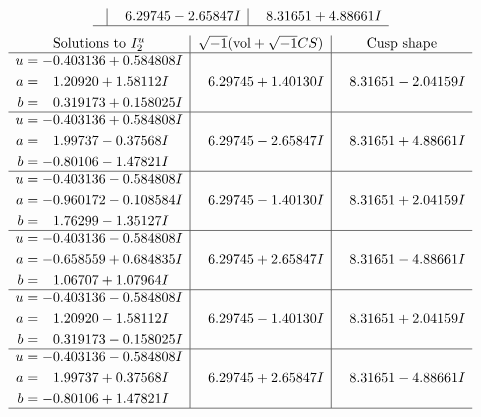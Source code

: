 \documentclass[1p]{elsarticle_modified}
\theoremstyle{definition}
\newcommand{\I}{\sqrt{-1}}
\begin{document}
$$\begin{array}{c|c|c}
 & \phantom{-}6.29745 - 2.65847 I & \phantom{-}8.31651 + 4.88661 I\\
 \hline 
 \end{array}$$\newpage$$\begin{array}{c|c|c}  
\text{Solutions to }I^u_{2}& \I (\text{vol} + \sqrt{-1}CS) & \text{Cusp shape}\\
 \hline 
\begin{aligned}
u &= -0.403136 + 0.584808 I \\
a &= \phantom{-}1.20920 + 1.58112 I \\
b &= \phantom{-}0.319173 + 0.158025 I\end{aligned}
 & \phantom{-}6.29745 + 1.40130 I & \phantom{-}8.31651 - 2.04159 I \\ \hline\begin{aligned}
u &= -0.403136 + 0.584808 I \\
a &= \phantom{-}1.99737 - 0.37568 I \\
b &= -0.80106 - 1.47821 I\end{aligned}
 & \phantom{-}6.29745 - 2.65847 I & \phantom{-}8.31651 + 4.88661 I \\ \hline\begin{aligned}
u &= -0.403136 - 0.584808 I \\
a &= -0.960172 - 0.108584 I \\
b &= \phantom{-}1.76299 - 1.35127 I\end{aligned}
 & \phantom{-}6.29745 - 1.40130 I & \phantom{-}8.31651 + 2.04159 I \\ \hline\begin{aligned}
u &= -0.403136 - 0.584808 I \\
a &= -0.658559 + 0.684835 I \\
b &= \phantom{-}1.06707 + 1.07964 I\end{aligned}
 & \phantom{-}6.29745 + 2.65847 I & \phantom{-}8.31651 - 4.88661 I \\ \hline\begin{aligned}
u &= -0.403136 - 0.584808 I \\
a &= \phantom{-}1.20920 - 1.58112 I \\
b &= \phantom{-}0.319173 - 0.158025 I\end{aligned}
 & \phantom{-}6.29745 - 1.40130 I & \phantom{-}8.31651 + 2.04159 I \\ \hline\begin{aligned}
u &= -0.403136 - 0.584808 I \\
a &= \phantom{-}1.99737 + 0.37568 I \\
b &= -0.80106 + 1.47821 I\end{aligned}
 & \phantom{-}6.29745 + 2.65847 I & \phantom{-}8.31651 - 4.88661 I\\
 \hline 
 \end{array}$$\newpage\newpage\renewcommand{\arraystretch}{1}
\end{document}
